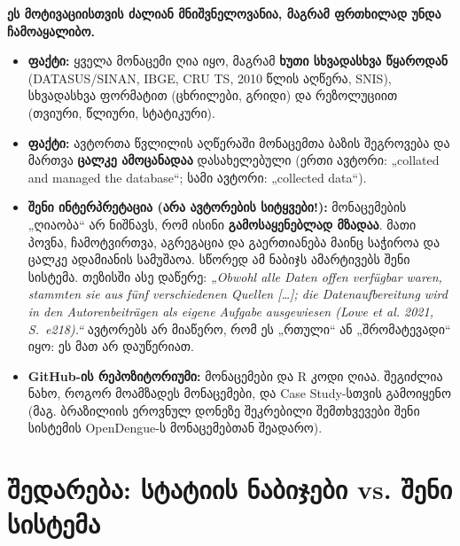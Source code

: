\documentclass[11pt,a4paper]{article}
\begin{document}
\begin{etl}
\textbf{ეს მოტივაციისთვის ძალიან მნიშვნელოვანია, მაგრამ ფრთხილად უნდა ჩამოაყალიბო.}
\begin{itemize}[leftmargin=1.5em]
  \item \textbf{ფაქტი:} ყველა მონაცემი ღია იყო, მაგრამ \textbf{ხუთი სხვადასხვა წყაროდან} (DATASUS/SINAN, IBGE, CRU TS, 2010 წლის
    აღწერა, SNIS), სხვადასხვა ფორმატით (ცხრილები, გრიდი) და რეზოლუციით (თვიური, წლიური, სტატიკური).
  \item \textbf{ფაქტი:} ავტორთა წვლილის აღწერაში მონაცემთა ბაზის შეგროვება და მართვა \textbf{ცალკე ამოცანადაა} დასახელებული
    (ერთი ავტორი: „collated and managed the database“; სამი ავტორი: „collected data“).
  \item \textbf{შენი ინტერპრეტაცია (არა ავტორების სიტყვები!):} მონაცემების „ღიაობა“ არ ნიშნავს, რომ ისინი \textbf{გამოსაყენებლად
    მზადაა}. მათი პოვნა, ჩამოტვირთვა, აგრეგაცია და გაერთიანება მაინც საჭიროა და ცალკე ადამიანის სამუშაოა. სწორედ ამ ნაბიჯს
    ამარტივებს შენი სისტემა. თეზისში ასე დაწერე: \textit{„Obwohl alle Daten offen verfügbar waren, stammten sie aus fünf
    verschiedenen Quellen [\ldots]; die Datenaufbereitung wird in den Autorenbeiträgen als eigene Aufgabe ausgewiesen (Lowe et al.
    2021, S.~e218).“} ავტორებს არ მიაწერო, რომ ეს „რთული“ ან „შრომატევადი“ იყო: ეს მათ არ დაუწერიათ.
  \item \textbf{GitHub-ის რეპოზიტორიუმი:} მონაცემები და R კოდი ღიაა. შეგიძლია ნახო, როგორ მოამზადეს მონაცემები, და Case Study-სთვის
    გამოიყენო (მაგ. ბრაზილიის ეროვნულ დონეზე შეკრებილი შემთხვევები შენი სისტემის OpenDengue-ს მონაცემებთან შეადარო).
\end{itemize}
\end{etl}

\section{შედარება: სტატიის ნაბიჯები vs. შენი სისტემა}\label{sec:shedareba}
\end{document}
